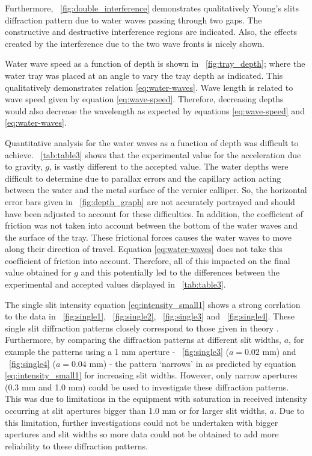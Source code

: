 \documentclass{article}
\newcommand{\figref}[2][\figurename~]{#1\ref{#2}}
\newcommand{\tabref}[2][\tablename~]{#1\ref{#2}}
\begin{document}
\vspace{2mm}
\noindent
Furthermore, \figref{fig:double_interference} demonstrates qualitatively Young's slits diffraction pattern due to water waves passing through two gaps. The constructive and destructive interference regions are indicated. Also, the effects created by the interference due to the two wave fronts is nicely shown.

\vspace{2mm}
\noindent
Water wave speed as a function of depth is shown in \figref{fig:tray_depth}; where the water tray was placed at an angle to vary the tray depth as indicated. This qualitatively demonstrates relation \eqref{eq:water-waves}. Wave length is related to wave speed given by equation \eqref{eq:wave-speed}. Therefore, decreasing depths would also decrease the wavelength as expected by equations \eqref{eq:wave-speed} and \eqref{eq:water-waves}.

\vspace{2mm}
\noindent
Quantitative analysis for the water waves as a function of depth was difficult to achieve. \tabref{tab:table3} shows that the experimental value for the acceleration due to gravity, $g$, is vastly different to the accepted value. The water depths were difficult to determine due to parallax errors and the capillary action acting between the water and the metal surface of the vernier calliper. So, the horizontal error bars given in \figref{fig:depth_graph} are not accurately portrayed and should have been adjusted to account for these difficulties. In addition, the coefficient of friction was not taken into account between the bottom of the water waves and the surface of the tray. These frictional forces causes the water waves to move along their direction of travel. Equation \eqref{eq:water-waves} does not take this coefficient of friction into account. Therefore, all of this impacted on the final value obtained for $g$ and this potentially led to the differences between the experimental and accepted values displayed in \tabref{tab:table3}. 

\vspace{2mm}
\noindent
The single slit intensity equation \eqref{eq:intensity_small1} shows a strong corrlation to the data in \figref{fig:single1}, \figref{fig:single2}, \figref{fig:single3} and \figref{fig:single4}. These single slit diffraction patterns closely correspond to those given in theory \cite{Book03}. Furthermore, by comparing the diffraction patterns at different slit widths, $a$, for example the patterns using a 1 mm aperture - \figref{fig:single3} ($a = 0.02$ mm) and \figref{fig:single4} ($a = 0.04$ mm) - the pattern `narrows' in as predicted by equation \eqref{eq:intensity_small1} for increasing slit widths. However, only narrow apertures (0.3 mm and 1.0 mm) could be used to investigate these diffraction patterns. This was due to limitations in the equipment with saturation in received intensity occurring at slit apertures bigger than 1.0 mm or for larger slit widths, $a$. Due to this limitation, further investigations could not be undertaken with bigger apertures and slit widths so more data could not be obtained to add more reliability to these diffraction patterns.
\end{document}
